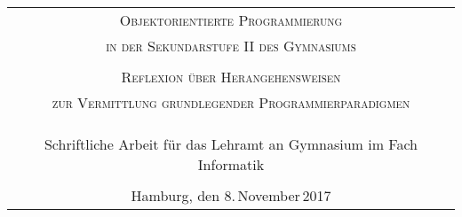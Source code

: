 \begin{titlepage}
\enlargethispage{\baselineskip}

\vspace*{15ex} 
\begin{tabular}{c}

 \\
 \Large\textsc{Objektorientierte Programmierung}\\
\Large\textsc{in der Sekundarstufe II des Gymnasiums} \\
\tiny \\
\normalsize\textsc{Reflexion über Herangehensweisen}\\
\normalsize\textsc{zur Vermittlung grundlegender Programmierparadigmen}\\		  
\\
\\
\\
\normalsize Schriftliche Arbeit für das Lehramt an Gymnasium im Fach Informatik\\
\\
\normalsize Hamburg, den 8.\,November\,2017

\end{tabular}


\end{titlepage}
